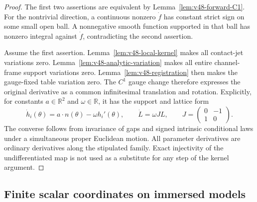 \begin{proof}
The first two assertions are equivalent by
Lemma~\ref{lem:v48-forward-C1}.  For the nontrivial direction, a
continuous nonzero $\dot f$ has constant strict sign on some small
open ball.  A nonnegative smooth function supported in that ball has
nonzero integral against $\dot f$, contradicting the second assertion.

Assume the first assertion.  Lemma~\ref{lem:v48-local-kernel} makes all
contact-jet variations zero.  Lemma~\ref{lem:v48-analytic-variation}
makes all entire channel-frame support variations zero.
Lemma~\ref{lem:v48-registration} then makes the gauge-fixed table
variation zero.  The $C^1$ gauge change therefore expresses the
original derivative as a common infinitesimal translation and rotation.
Explicitly, for constants $a\in\mathbb R^2$ and $\omega\in\mathbb R$,
it has the support and lattice form
\begin{equation}\label{eq:v48-gauge-kernel}
       \dot h_i(\theta)=a\cdot n(\theta)-\omega h_i'(\theta),
                   \qquad \dot L=\omega J L,
       \qquad J=\begin{pmatrix}0&-1\\1&0\end{pmatrix}.
\end{equation}
The converse follows from invariance of gaps and signed intrinsic
conditional laws under a simultaneous proper Euclidean motion.  All
parameter derivatives are ordinary derivatives along the stipulated
family.  Exact injectivity of the undifferentiated map is not used as
a substitute for any step of the kernel argument.
\end{proof}

\subsection{Finite scalar coordinates on immersed models}


